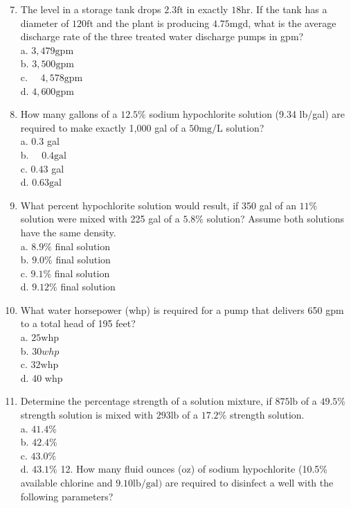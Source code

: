 \documentclass[10pt]{article}
\begin{document}
\begin{enumerate}
  \setcounter{enumi}{6}
  \item The level in a storage tank drops $2.3 \mathrm{ft}$ in exactly $18 \mathrm{hr}$. If the tank has a diameter of $120 \mathrm{ft}$ and the plant is producing $4.75 \mathrm{mgd}$, what is the average discharge rate of the three treated water discharge pumps in gpm?\\
a. $3,479 \mathrm{gpm}$\\
b. $3,500 \mathrm{gpm}$\\
c. $\quad 4,578 \mathrm{gpm}$\\
d. $4,600 \mathrm{gpm}$

  \item How many gallons of a $12.5 \%$ sodium hypochlorite solution (9.34 lb/gal) are required to make exactly 1,000 gal of a $50 \mathrm{mg} / \mathrm{L}$ solution?\\
a. $0.3$ gal\\
b. $\quad 0.4 \mathrm{gal}$\\
c. $0.43$ gal\\
d. $0.63 \mathrm{gal}$

  \item What percent hypochlorite solution would result, if 350 gal of an $11 \%$ solution were mixed with 225 gal of a $5.8 \%$ solution? Assume both solutions have the same density.\\
a. $8.9 \%$ final solution\\
b. $9.0 \%$ final solution\\
c. $9.1 \%$ final solution\\
d. $9.12 \%$ final solution

  \item What water horsepower (whp) is required for a pump that delivers 650 gpm to a total head of 195 feet?\\
a. $25 \mathrm{whp}$\\
b. $30 w h p$\\
c. $32 \mathrm{whp}$\\
d. 40 whp

  \item Determine the percentage strength of a solution mixture, if $875 \mathrm{lb}$ of a $49.5 \%$ strength solution is mixed with $293 \mathrm{lb}$ of a $17.2 \%$ strength solution.\\
a. $41.4 \%$\\
b. $42.4 \%$\\
c. $43.0 \%$\\
d. $43.1 \%$ 12. How many fluid ounces (oz) of sodium hypochlorite (10.5\% available chlorine and $9.10 \mathrm{lb} / \mathrm{gal})$ are required to disinfect a well with the following parameters?

\end{enumerate}
\end{document}
